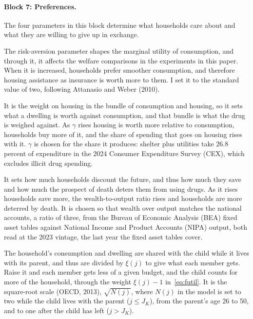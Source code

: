 \documentclass[10pt]{article}
\begin{document}
\paragraph{Block 7: Preferences.}  The four parameters in this block determine what households care about and what they are willing to give up in exchange.
\begin{description}\setlength{\itemsep}{0.25em}\setlength{\parskip}{0em}
\item[$\sigma$, risk aversion.]  The risk-aversion parameter shapes the marginal utility of consumption, and through it, it affects the welfare comparisons in the experiments in this paper. When it is increased, households prefer smoother consumption, and therefore housing assistance as insurance is worth more to them. I set it to the standard value of two, following
Attanasio and Weber (2010).
\item[$\gamma$, the weight on housing services.] It is the weight on housing in the
bundle of consumption and housing, so it sets what a dwelling is worth against
consumption, and that bundle is what the drug is weighed against. As
$\gamma$ rises housing is worth more relative to consumption, households buy more of it,
and the share of spending that goes on housing rises with it. $\gamma$ is chosen for the share
it produces: shelter plus utilities take $26.8$ percent of expenditure in the 2024 Consumer Expenditure Survey (CEX), which excludes illicit drug spending.
\item[$\beta$, the discount factor.] It sets how much households discount the
future, and thus how much they save and how much the prospect of death deters them from using drugs. As it rises households save more, the
 wealth-to-output ratio rises and households are more deterred by death. It is chosen so that wealth over output
matches the national accounts, a ratio of three, from the Bureau of Economic Analysis (BEA) fixed asset tables
against National Income and Product Accounts (NIPA) output, both read at the 2023 vintage, the last year the fixed asset tables cover.
\item[$\xi(j)$, the equivalence scale.] The household's consumption and
dwelling are shared with the child while it lives with its parent, and thus are divided by
$\xi(j)$ to give what each member gets. Raise it and each member gets less of a given budget, and the child counts for more of the household, through the weight $\xi(j)-1$ in~\eqref{eq:futil}. It is the square-root scale (OECD, 2013), $\sqrt{N(j)}$, where $N(j)$ in the model is set to two while
the child lives with the parent ($j\le J_K$), from the parent's age 26 to 50, and to one after the child has left ($j>J_K$).
\end{description}
\end{document}
